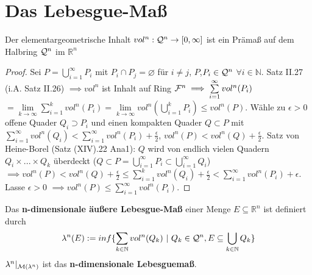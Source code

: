 \documentclass[11pt,a4paper,fleqn,openany]{report}
\begin{document}
  \chapter{Das Lebesgue-Maß}
    \begin{lemma}
      Der elementargeometrische Inhalt $vol^n: \mathcal{Q}^n \to [0, \infty]$ ist ein Prämaß auf dem Halbring $\mathcal{Q}^n$ im $\mathbb{R}^n$
    \end{lemma}

    \begin{proof}
      Sei $P = \bigcup\limits_{i=1}^{\infty}P_i$ mit $P_i \cap P_j = \varnothing$ für $i\neq j$, $P$,$P_i \in \mathcal{Q}^n$ $\forall i\in \mathbb{N}$. \newline
      Satz II.27 (i.A. Satz II.26) $\implies vol^n$ ist Inhalt auf Ring $\mathcal{F}^n  \implies \sum\limits_{i=1}^{\infty}vol^n(P_i)$ \newline $= \lim\limits_{k\to\infty}\sum\limits_{i=1}^{k}vol^n(P_i) = \lim\limits_{k\to\infty}vol^n(\bigcup\limits_{i=1}^{k}P_i) \leq vol^n(P)$. \newline
      Wähle zu $\epsilon > 0$ offene Quader $Q_i \supset P_i$ und einen kompakten Quader $Q \subset P$ mit $\sum\limits_{i=1}^{\infty}vol^n(Q_i) < \sum\limits_{i=1}^{\infty} vol^n(P_i) + \frac{\epsilon}{2}$, $vol^n(P)<vol^n(Q)+\frac{\epsilon}{2}$. \newline
      Satz von Heine-Borel (Satz (XIV).22 Ana1): $Q$ wird von endlich vielen Quadern \newline $Q_i\times ... \times Q_k$ überdeckt ($Q\subset P = \bigcup\limits_{i=1}^{\infty}P_i \subset  \bigcup\limits_{i=1}^{\infty}Q_i$) \newline $\implies vol^n(P) < vol^n(Q) +\frac{\epsilon}{2} \leq \sum\limits_{i=1}^{k}vol^n(Q_i) + \frac{\epsilon}{2} < \sum\limits_{i=1}^{\infty}vol^n(P_i)+\epsilon$. \newline
      Lasse $\epsilon > 0$ $\implies vol^n(P) \leq \sum\limits_{i=1}^{\infty}vol^n(P_i)$. 
    \end{proof}

    \begin{definition}
      Das \textbf{n-dimensionale äußere Lebesgue-Maß} einer Menge $E \subseteq \mathbb{R}^n$ ist definiert durch
      \begin{align*}
        \lambda^n(E) := inf\{\sum\limits_{k \in \mathbb{N}} vol^n(Q_k) \ | \ Q_k \in \script{Q}^n, E \subseteq \bigcup\limits_{k \in \mathbb{N}} Q_k\}
      \end{align*}
      $\lambda^n|_{\mathcal{M}(\lambda^n)}$ ist das \textbf{n-dimensionale Lebesguemaß}.
    \end{definition}
\end{document}
